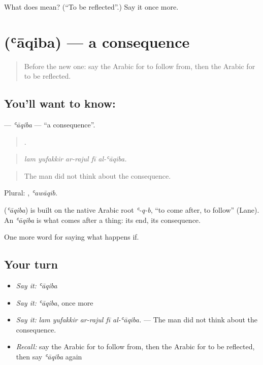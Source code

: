 \begin{tcolorbox}[breakable,colback=teal!4,colframe=teal!35!black,title={Before you move on}]
What does  mean? (\textquotedblleft{}To be reflected\textquotedblright{}.) Say it once more.
\end{tcolorbox}
\section[\texorpdfstring{\ar{عاقبة} (ʿāqiba)}{عاقبة (ʿāqiba)}]{ (ʿāqiba) — a consequence}

\label{lesson:AR-C414-aqiba}



\begin{quote}
Before the new one: say the Arabic for to follow from, then the Arabic for to be reflected.
\end{quote}

\subsection*{You'll want to know: }
\textbf{} — \emph{ʿāqiba} — \textquotedblleft{}a consequence\textquotedblright{}.

\begin{quote}
    .
\end{quote}

\begin{quote}
\emph{lam yufakkir ar-rajul fī al-ʿāqiba.}
\end{quote}

\begin{quote}
The man did not think about the consequence.
\end{quote}

Plural: , \emph{ʿawāqib}.

\begin{cousinweb}
\textbf{} (\emph{ʿāqiba}) is built on the native Arabic root \emph{ʿ-q-b}, \textquotedblleft{}to come after, to follow\textquotedblright{} (Lane). An \emph{ʿāqiba} is what comes after a thing: its end, its consequence.
\end{cousinweb}

\begin{grammarlens}[title={What you've built}]
One more word for saying what happens if.
\end{grammarlens}

\subsection*{Your turn}
\begin{itemize}
\raggedright
  \item \emph{Say it:} \emph{ʿāqiba}
  \item \emph{Say it:} \emph{ʿāqiba}, once more
  \item \emph{Say it:} \emph{lam yufakkir ar-rajul fī al-ʿāqiba.} — The man did not think about the consequence.
  \item \emph{Recall:} say the Arabic for to follow from, then the Arabic for to be reflected, then say \emph{ʿāqiba} again
\end{itemize}

